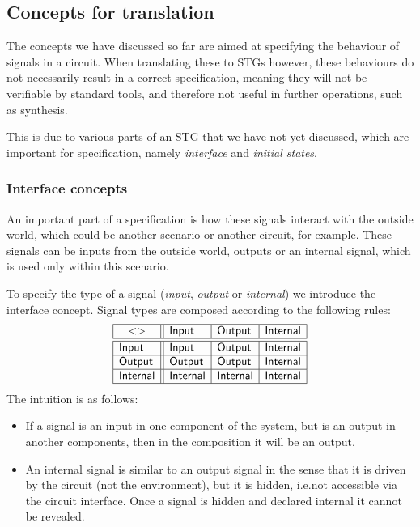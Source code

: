 \documentclass[british,conference,compsoc]{IEEEtran}
\begin{document}

\subsection{Concepts for translation\label{sub:trans-concepts}}

The concepts we have discussed so far are aimed at specifying the behaviour of signals in a circuit.
When translating these to STGs however, these behaviours do not necessarily result in a correct
specification, meaning they will not be verifiable by standard tools, and therefore not useful in 
further operations, such as synthesis.

This is due to various parts of an STG that we have not yet discussed, which are important
for specification, namely \emph{interface} and \emph{initial states}.


\subsubsection{Interface concepts\label{sub:interface}} 

An important part of a specification is how these signals interact with the outside world, which could
be another scenario or another circuit, for example. These signals can be inputs from the outside world,
outputs or an internal signal, which is used only within this scenario. 

To specify the type of a signal (\emph{input},
\emph{output} or \emph{internal}) we introduce the \textsf{interface} concept.
Signal types are composed according to the following rules:
\[
\begin{array}{|l||l|l|l|}
\hline
\multicolumn{1}{|c||}{<>} & \mathsf{Input} & \mathsf{Output} &
\mathsf{Internal} \\ \hline \hline
\mathsf{Input} & \mathsf{Input} & \mathsf{Output} & \mathsf{Internal} \\ \hline
\mathsf{Output} & \mathsf{Output} & \mathsf{Output} & \mathsf{Internal} \\
\hline
\mathsf{Internal}& \mathsf{Internal} & \mathsf{Internal} & \mathsf{Internal} \\
\hline
\end{array}
\]
The intuition is as follows:
\begin{itemize}
    \item If a signal is an input in one component of the system, but is an
    output in another components, then in the composition it will be an output.
    \item An internal signal is similar to an output signal in the sense
that it is driven by the circuit (not the environment), but it is hidden, i.e.not accessible via the circuit interface. Once a signal is hidden and declared    internal it cannot be revealed.
\end{itemize}
\end{document}
